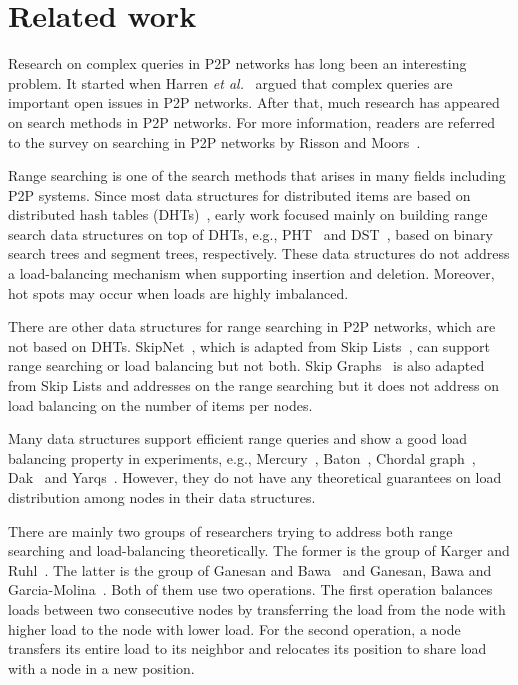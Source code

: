 \documentclass[a4paper]{article}
\begin{document}
\section{Related work}
\label{sec:relatedwork}

Research on complex queries in P2P networks has long been an
interesting problem. It started when Harren {\em et
  al.}~\cite{Harren02complexqueries} argued that  complex queries
are important open issues in P2P networks. After that, much research has appeared on search methods in P2P networks. For more
information, readers are referred to the survey on searching in P2P
networks by Risson and Moors~\cite{Risson06Survey}.

Range searching is one of the search methods that arises in many fields
including P2P systems. Since most data structures for distributed
items are based on distributed hash tables (DHTs)~\cite{Kademlia02, CAN01,
  Pastry01,  Chord03, tapestry04}, early work focused mainly
on building range search data structures on top of DHTs, e.g.,
PHT~\cite{PHT2004} and DST~\cite{DST06}, based on binary search trees
and segment trees, respectively. These data structures do not address a
load-balancing mechanism when supporting insertion and deletion. Moreover,
hot spots may occur when loads are highly imbalanced.

There are other data structures for range searching in P2P networks,
which are not based on DHTs. SkipNet~\cite{SkipNet03}, which is adapted
from Skip Lists~\cite{skiplist90}, can support range searching or load
balancing but not both. Skip Graphs~\cite{Aspnes-SODA03} is also adapted from Skip Lists and
addresses on the range searching but it does not address on load balancing on the number of items per nodes.

Many data structures support efficient range queries and show a good 
load balancing property in experiments, e.g.,
Mercury~\cite{Mercury_sigcomm04}, Baton~\cite{baton05},
 Chordal graph~\cite{Joung08}, Dak~\cite{Dak06} and
Yarqs~\cite{Yarqs09}. However, they do not have any
theoretical guarantees on load distribution among nodes in their data
structures.

There are mainly two groups of researchers trying to address both range searching and
load-balancing theoretically. The former is the group of Karger and Ruhl~\cite{Karger03newalgorithms, 
Karger04simpleefficient}. The latter is the group of Ganesan and Bawa~\cite{Ganesan03} 
and Ganesan, Bawa and Garcia-Molina~\cite{GanesanBGM04-vldb}. 
Both of them use two operations. The first operation balances loads between two consecutive nodes 
by transferring the load from the node with higher load to the node with lower load. For the second operation, a node  
transfers its entire load to its neighbor and relocates its position to share load with 
a node  in a new position.
\end{document}
